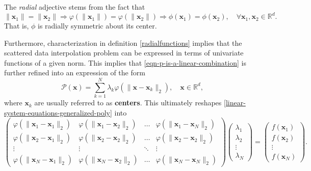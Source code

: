 \documentclass[12pt]{report} %
\newcommand{\tmmathbf}[1]{\ensuremath{\boldsymbol{#1}}}
\newcommand{\tmem}[1]{{\em #1\/}}
\begin{document}
The {\tmem{radial}} adjective stems from the fact that
\[ \| \tmmathbf{x}_1 \| = \| \tmmathbf{x}_2 \| \Rightarrow \varphi (\|
  \tmmathbf{x}_1 \|) = \varphi (\| \tmmathbf{x}_2 \|) \Rightarrow \phi
  (\tmmathbf{x}_1) = \phi (\tmmathbf{x}_2), \quad \forall \tmmathbf{x}_1,
  \tmmathbf{x}_2 \in \mathbb{R}^d . \]
That is, $\phi$ is radially symmetric about its center.

Furthermore, characterization in definition \ref{radialfunctions} implies that the scattered data interpolation problem can be expressed in terms of univariate functions of a given norm.
This implies that \eqref{eqn-p-is-a-linear-combination} is further refined into an
expression of the form
\begin{equation}
  \mathcal{P} (\tmmathbf{x}) = \sum_{k = 1}^N \lambda_k \varphi (\|
  \tmmathbf{x}-\tmmathbf{x}_k \|_2), \quad \tmmathbf{x} \in \mathbb{R}^d,
  \label{eqn-p-is-a-linear-combination-of-rbfs}
\end{equation}
where $\tmmathbf{x}_k$ are usually referred to as \textbf{centers}. This ultimately reshapes \eqref{linear-system-equations-generalized-poly} into
\begin{equation}
  \left(\begin{array}{cccc}
      \varphi (\| \tmmathbf{x}_1 -\tmmathbf{x}_1 \|_2) & \varphi (\|
      \tmmathbf{x}_1 -\tmmathbf{x}_2 \|_2)             & \ldots      & \varphi (\| \tmmathbf{x}_1
      -\tmmathbf{x}_N \|_2)                                                                                \\
      \varphi (\| \tmmathbf{x}_2 -\tmmathbf{x}_1 \|_2) & \varphi (\|
      \tmmathbf{x}_2 -\tmmathbf{x}_2 \|_2)             & \ldots      & \varphi (\| \tmmathbf{x}_2
      -\tmmathbf{x}_2 \|_2)                                                                                \\
      \vdots                                           & \vdots      & \ddots                     & \vdots \\
      \varphi (\| \tmmathbf{x}_N -\tmmathbf{x}_1 \|_2) & \varphi (\|
      \tmmathbf{x}_N -\tmmathbf{x}_2 \|_2)             & \ldots      & \varphi (\| \tmmathbf{x}_N
      -\tmmathbf{x}_N \|_2)
    \end{array}\right) \left(\begin{array}{c}
      \lambda_1 \\
      \lambda_2 \\
      \vdots    \\
      \lambda_N
    \end{array}\right) = \left(\begin{array}{c}
      f (\tmmathbf{x}_1) \\
      f (\tmmathbf{x}_2) \\
      \vdots             \\
      f (\tmmathbf{x}_N)
    \end{array}\right).
  \label{eqn-linear-system-equations-rbf}
\end{equation}
\end{document}
